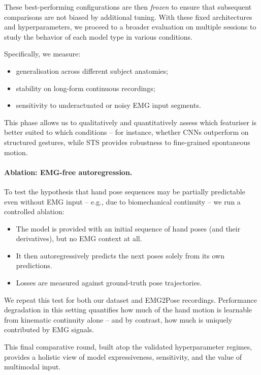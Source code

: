 These best-performing configurations are then \emph{frozen} to ensure that
subsequent comparisons are not biased by additional tuning. With these fixed
architectures and hyperparameters, we proceed to a broader evaluation on
multiple sessions to study the behavior of each model type in various
conditions.

Specifically, we measure:

\begin{itemize}
  \item generalisation across different subject anatomies;
  \item stability on long-form continuous recordings;
  \item sensitivity to underactuated or noisy EMG input segments.
\end{itemize}

This phase allows us to qualitatively and quantitatively assess which featuriser
is better suited to which conditions -- for instance, whether CNNs outperform on
structured gestures, while STS provides robustness to fine-grained spontaneous
motion.

\paragraph{Ablation: EMG-free autoregression.}
To test the hypothesis that hand pose sequences may be partially predictable
even without EMG input -- e.g., due to biomechanical continuity -- we run a
controlled ablation:

\begin{itemize}
  \item The model is provided with an initial sequence of hand poses (and their
        derivatives), but no EMG context at all.
  \item It then autoregressively predicts the next poses solely from its own
        predictions.
  \item Losses are measured against ground-truth pose trajectories.
\end{itemize}

We repeat this test for both our dataset and EMG2Pose recordings.
Performance degradation in this setting quantifies how much of the hand motion
is learnable from kinematic continuity alone -- and by contrast, how much is
uniquely contributed by EMG signals.

This final comparative round, built atop the validated hyperparameter regimes,
provides a holistic view of model expressiveness, sensitivity, and the value of
multimodal input.
